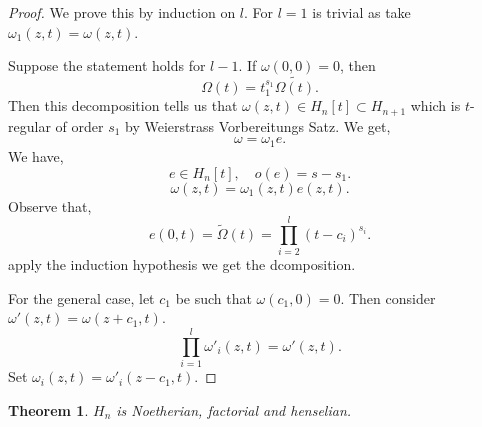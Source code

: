 \documentclass{article}
\newtheorem{theorem}{Theorem} [section]
\begin{document}
\begin{proof}
  We prove this by induction on $l$. For $l=1$ is trivial as take $\omega_1(z,t) = \omega(z,t)$.
  \par Suppose the statement holds for $l-1$. If $\omega(0,0) = 0$, then 
  \begin{equation*}
    \Omega(t) = t_1^{s_1}\tilde{\Omega(t)}.
  \end{equation*}
  Then this decomposition tells us that $\omega(z,t)\in H_n[t]\subset H_{n+1}$ which is $t$-regular of order $s_1$ by Weierstrass Vorbereitungs Satz. We get,
  \begin{equation*}
    \omega = \omega_1e.
  \end{equation*}
  We have,
  \begin{equation*}
  e\in H_{n}[t],\quad o(e) = s-s_1.
  \end{equation*}
  \begin{equation*}
    \omega(z,t) = \omega_1(z,t)e(z,t).
  \end{equation*}
  Observe that,
  \begin{equation*}
    e(0,t) = \tilde{\Omega}(t) = \prod_{i=2}^l (t-c_i)^{s_i}.
  \end{equation*}
  apply the induction hypothesis we get the dcomposition.
  \par For the general case, let $c_1$ be such that $\omega(c_1,0) = 0$. Then consider $\omega'(z,t)=\omega(z+c_1,t)$. 
  \begin{equation*}
    \prod_{i=1}^l \omega'_i(z,t) = \omega'(z,t).
  \end{equation*}
  Set $\omega_i(z,t) = \omega'_i(z-c_1,t)$.
\end{proof}

\begin{theorem}
  \label{theorem_4_1}
  $H_n$ is Noetherian, factorial and henselian.
\end{theorem}
\end{document}
